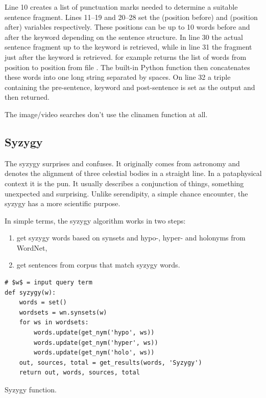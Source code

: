 Line \num{10} creates a list of punctuation marks needed to determine a suitable sentence fragment. Lines 11--19 and 20--28 set the  (position before) and  (position after) variables respectively. These positions can be up to \num{10} words before and after the keyword  depending on the sentence structure. In line \num{30} the actual sentence fragment up to the keyword is retrieved, while in line \num{31} the fragment just after the keyword is retrieved.  for example returns the list of words from position  to position  from file . The built-in Python  function then concatenates these words into one long string separated by spaces. On line \num{32} a triple containing the pre-sentence, keyword and post-sentence is set as the output and then returned.

The image/video searches don't use the clinamen function at all.


\subsection{Syzygy}

The syzygy surprises and confuses. It originally comes from astronomy and denotes the alignment of three celestial bodies in a straight line. In a pataphysical context it is the pun. It usually describes a conjunction of things, something unexpected and surprising. Unlike serendipity, a simple chance encounter, the syzygy has a more scientific purpose.

In simple terms, the syzygy algorithm works in two steps:
\begin{enumerate}
  \item get syzygy words based on synsets and hypo-, hyper- and holonyms from WordNet,
  \item get sentences from corpus that match syzygy words.
\end{enumerate}

\begin{listing}
  \begin{verbatim}
# $w$ = input query term
def syzygy(w):
    words = set()
    wordsets = wn.synsets(w)
    for ws in wordsets:
        words.update(get_nym('hypo', ws))
        words.update(get_nym('hyper', ws))
        words.update(get_nym('holo', ws))
    out, sources, total = get_results(words, 'Syzygy')
    return out, words, sources, total
  \end{verbatim}
\caption{Syzygy function.}
\label{code:syzygy}
\end{listing}

